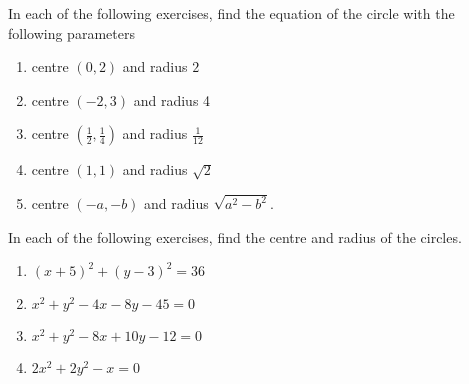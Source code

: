 In each of the following exercises, find the equation of the circle with the following parameters
\begin{enumerate}[label=\thesection.\arabic*,ref=\thesection.\theenumi]
 \item centre $(0,2)$ and radius $2$
	 \\
		\solution
\label{chapters/11/11/1/1}

%
  \item centre $(-2,3)$ and radius 4
	 \\
		\solution
\label{chapters/11/11/1/2}


  \item centre $\left(\frac{1}{2}, \frac{1}{4}\right)$ and radius $\frac{1}{12}$
\label{chapters/11/11/1/3}
	 \\
		\solution


  \item centre $(1,1)$ and radius $\sqrt{2}$

  \item centre $(-a,-b)$ and radius $\sqrt{a^{2}-b^{2}}$.
\end{enumerate}


In each of the following exercises,  find the centre and radius of the circles.
\begin{enumerate}[resume*]
\item  $(x+5)^{2}+(y-3)^{2}=36$ 
\item  $x^{2}+y^{2}-4 x-8 y-45=0$
\item  $x^{2}+y^{2}-8 x+10 y-12=0$ 
\item  $2 x^{2}+2 y^{2}-x=0$
\end{enumerate}

